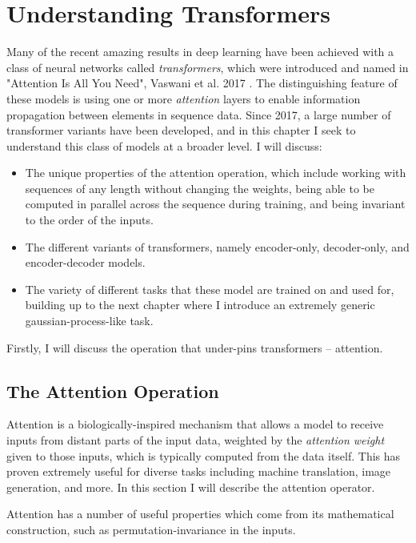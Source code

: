 \chapter{Understanding Transformers}
\label{C:transformers}

Many of the recent amazing results in deep learning have been achieved with a class of neural networks called \textit{transformers}, which were introduced and named in "Attention Is All You Need", Vaswani et al. 2017 \cite{attention-is-all-you-need}. The distinguishing feature of these models is using one or more \textit{attention} layers to enable information propagation between elements in sequence data. Since 2017, a large number of transformer variants have been developed, and in this chapter I seek to understand this class of models at a broader level. I will discuss:

\begin{itemize}
    \item The unique properties of the attention operation, which include working with sequences of any length without changing the weights, being able to be computed in parallel across the sequence during training, and being invariant to the order of the inputs.
    \item The different variants of transformers, namely encoder-only, decoder-only, and encoder-decoder models.
    \item The variety of different tasks that these model are trained on and used for, building up to the next chapter where I introduce an extremely generic gaussian-process-like task.
\end{itemize}

Firstly, I will discuss the operation that under-pins transformers -- attention.

\section{The Attention Operation}

Attention is a biologically-inspired mechanism that allows a model to receive inputs from distant parts of the input data, weighted by the \textit{attention weight} given to those inputs, which is typically computed from the data itself. This has proven extremely useful for diverse tasks including machine translation, image generation, and more. In this section I will describe the attention operator.

Attention has a number of useful properties which come from its mathematical construction, such as permutation-invariance in the inputs.

